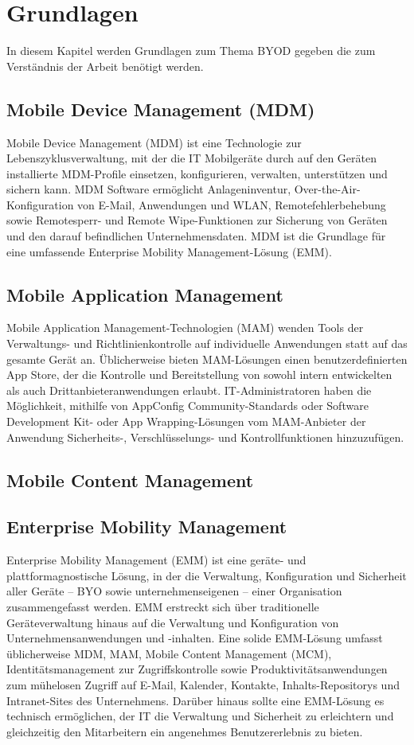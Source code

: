 \chapter{Grundlagen}
\label{cha:Grundlagen}
In diesem Kapitel werden Grundlagen zum Thema BYOD gegeben die zum Verständnis der Arbeit benötigt werden. 


\section{Mobile Device Management (MDM)}
Mobile Device Management (MDM) ist eine Technologie zur Lebenszyklusverwaltung, mit der die IT Mobilgeräte durch auf den Geräten installierte MDM-Profile einsetzen, konfigurieren, verwalten, unterstützen und sichern kann. MDM Software ermöglicht Anlageninventur, Over-the-Air-Konfiguration von E-Mail, Anwendungen und WLAN, Remotefehlerbehebung sowie Remotesperr- und Remote Wipe-Funktionen zur Sicherung von Geräten und den darauf befindlichen Unternehmensdaten. MDM ist die Grundlage für eine umfassende Enterprise Mobility Management-Lösung (EMM). 

\section{Mobile Application Management}
Mobile Application Management-Technologien (MAM) wenden Tools der Verwaltungs- und Richtlinienkontrolle auf individuelle Anwendungen statt auf das gesamte Gerät an. Üblicherweise bieten MAM-Lösungen einen benutzerdefinierten App Store, der die Kontrolle und Bereitstellung von sowohl intern entwickelten als auch Drittanbieteranwendungen erlaubt. IT-Administratoren haben die Möglichkeit, mithilfe von AppConfig Community-Standards oder Software Development Kit- oder App Wrapping-Lösungen vom MAM-Anbieter der Anwendung Sicherheits-, Verschlüsselungs- und Kontrollfunktionen hinzuzufügen. 

\section{Mobile Content Management}

\section{Enterprise Mobility Management}
\label{sec:EMM}
Enterprise Mobility Management (EMM) ist eine geräte- und plattformagnostische Lösung, in der die Verwaltung, Konfiguration und Sicherheit aller Geräte – BYO sowie unternehmenseigenen – einer Organisation zusammengefasst werden. EMM erstreckt sich über traditionelle Geräteverwaltung hinaus auf die Verwaltung und Konfiguration von Unternehmensanwendungen und -inhalten.  Eine solide EMM-Lösung umfasst üblicherweise MDM, MAM, Mobile Content Management (MCM), Identitätsmanagement zur Zugriffskontrolle sowie Produktivitätsanwendungen zum mühelosen Zugriff auf E-Mail, Kalender, Kontakte, Inhalts-Repositorys und Intranet-Sites des Unternehmens. Darüber hinaus sollte eine EMM-Lösung es technisch ermöglichen, der IT die Verwaltung und Sicherheit zu erleichtern und gleichzeitig den Mitarbeitern ein angenehmes Benutzererlebnis zu bieten. 

